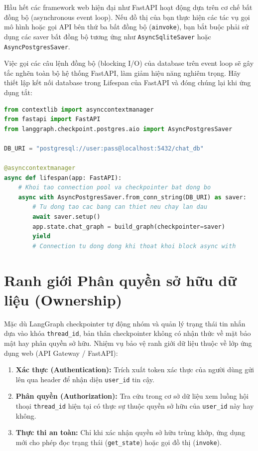 Hầu hết các framework web hiện đại như FastAPI hoạt động dựa trên cơ chế bất đồng bộ (asynchronous event loop). Nếu đồ thị của bạn thực hiện các tác vụ gọi mô hình hoặc gọi API bên thứ ba bất đồng bộ (\texttt{ainvoke}), bạn bắt buộc phải sử dụng các saver bất đồng bộ tương ứng như \texttt{AsyncSqliteSaver} hoặc \texttt{AsyncPostgresSaver}. 

Việc gọi các câu lệnh đồng bộ (blocking I/O) của database trên event loop sẽ gây tắc nghẽn toàn bộ hệ thống FastAPI, làm giảm hiệu năng nghiêm trọng. Hãy thiết lập kết nối database trong Lifespan của FastAPI và đóng chúng lại khi ứng dụng tắt:

\begin{lstlisting}[language=Python,caption={Khung lifecycle cho checkpointer production}]
from contextlib import asynccontextmanager
from fastapi import FastAPI
from langgraph.checkpoint.postgres.aio import AsyncPostgresSaver

DB_URI = "postgresql://user:pass@localhost:5432/chat_db"

@asynccontextmanager
async def lifespan(app: FastAPI):
    # Khoi tao connection pool va checkpointer bat dong bo
    async with AsyncPostgresSaver.from_conn_string(DB_URI) as saver:
        # Tu dong tao cac bang can thiet neu chay lan dau
        await saver.setup()
        app.state.chat_graph = build_graph(checkpointer=saver)
        yield
        # Connection tu dong dong khi thoat khoi block async with
\end{lstlisting}

\section{Ranh giới Phân quyền sở hữu dữ liệu (Ownership)}

Mặc dù LangGraph checkpointer tự động nhóm và quản lý trạng thái tin nhắn dựa vào khóa \texttt{thread\_id}, bản thân checkpointer không có nhận thức về mặt bảo mật hay phân quyền sở hữu. Nhiệm vụ bảo vệ ranh giới dữ liệu thuộc về lớp ứng dụng web (API Gateway / FastAPI):

\begin{enumerate}
  \item \textbf{Xác thực (Authentication):} Trích xuất token xác thực của người dùng gửi lên qua header để nhận diện \texttt{user\_id} tin cậy.
  \item \textbf{Phân quyền (Authorization):} Tra cứu trong cơ sở dữ liệu xem luồng hội thoại \texttt{thread\_id} hiện tại có thực sự thuộc quyền sở hữu của \texttt{user\_id} này hay không.
  \item \textbf{Thực thi an toàn:} Chỉ khi xác nhận quyền sở hữu trùng khớp, ứng dụng mới cho phép đọc trạng thái (\texttt{get\_state}) hoặc gọi đồ thị (\texttt{invoke}).
\end{enumerate}

